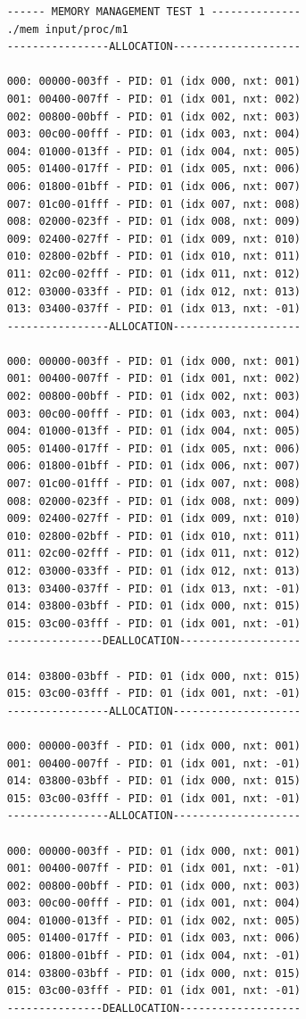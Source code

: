\documentclass[a4paper]{article}
\begin{document}
    \begin{lstlisting}
    ------ MEMORY MANAGEMENT TEST 1 --------------
    ./mem input/proc/m1
    ----------------ALLOCATION--------------------
    
    000: 00000-003ff - PID: 01 (idx 000, nxt: 001)
    001: 00400-007ff - PID: 01 (idx 001, nxt: 002)
    002: 00800-00bff - PID: 01 (idx 002, nxt: 003)
    003: 00c00-00fff - PID: 01 (idx 003, nxt: 004)
    004: 01000-013ff - PID: 01 (idx 004, nxt: 005)
    005: 01400-017ff - PID: 01 (idx 005, nxt: 006)
    006: 01800-01bff - PID: 01 (idx 006, nxt: 007)
    007: 01c00-01fff - PID: 01 (idx 007, nxt: 008)
    008: 02000-023ff - PID: 01 (idx 008, nxt: 009)
    009: 02400-027ff - PID: 01 (idx 009, nxt: 010)
    010: 02800-02bff - PID: 01 (idx 010, nxt: 011)
    011: 02c00-02fff - PID: 01 (idx 011, nxt: 012)
    012: 03000-033ff - PID: 01 (idx 012, nxt: 013)
    013: 03400-037ff - PID: 01 (idx 013, nxt: -01)
    ----------------ALLOCATION--------------------
    
    000: 00000-003ff - PID: 01 (idx 000, nxt: 001)
    001: 00400-007ff - PID: 01 (idx 001, nxt: 002)
    002: 00800-00bff - PID: 01 (idx 002, nxt: 003)
    003: 00c00-00fff - PID: 01 (idx 003, nxt: 004)
    004: 01000-013ff - PID: 01 (idx 004, nxt: 005)
    005: 01400-017ff - PID: 01 (idx 005, nxt: 006)
    006: 01800-01bff - PID: 01 (idx 006, nxt: 007)
    007: 01c00-01fff - PID: 01 (idx 007, nxt: 008)
    008: 02000-023ff - PID: 01 (idx 008, nxt: 009)
    009: 02400-027ff - PID: 01 (idx 009, nxt: 010)
    010: 02800-02bff - PID: 01 (idx 010, nxt: 011)
    011: 02c00-02fff - PID: 01 (idx 011, nxt: 012)
    012: 03000-033ff - PID: 01 (idx 012, nxt: 013)
    013: 03400-037ff - PID: 01 (idx 013, nxt: -01)
    014: 03800-03bff - PID: 01 (idx 000, nxt: 015)
    015: 03c00-03fff - PID: 01 (idx 001, nxt: -01)
    ---------------DEALLOCATION-------------------
    
    014: 03800-03bff - PID: 01 (idx 000, nxt: 015)
    015: 03c00-03fff - PID: 01 (idx 001, nxt: -01)
    ----------------ALLOCATION--------------------
    
    000: 00000-003ff - PID: 01 (idx 000, nxt: 001)
    001: 00400-007ff - PID: 01 (idx 001, nxt: -01)
    014: 03800-03bff - PID: 01 (idx 000, nxt: 015)
    015: 03c00-03fff - PID: 01 (idx 001, nxt: -01)
    ----------------ALLOCATION--------------------
    
    000: 00000-003ff - PID: 01 (idx 000, nxt: 001)
    001: 00400-007ff - PID: 01 (idx 001, nxt: -01)
    002: 00800-00bff - PID: 01 (idx 000, nxt: 003)
    003: 00c00-00fff - PID: 01 (idx 001, nxt: 004)
    004: 01000-013ff - PID: 01 (idx 002, nxt: 005)
    005: 01400-017ff - PID: 01 (idx 003, nxt: 006)
    006: 01800-01bff - PID: 01 (idx 004, nxt: -01)
    014: 03800-03bff - PID: 01 (idx 000, nxt: 015)
    015: 03c00-03fff - PID: 01 (idx 001, nxt: -01)
    ---------------DEALLOCATION-------------------
    

\end{lstlisting}
\end{document}

